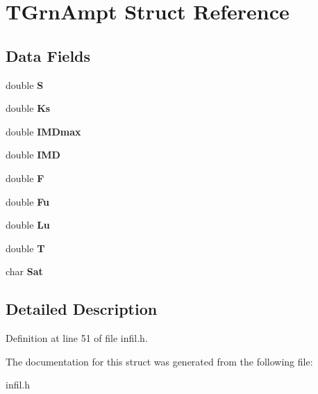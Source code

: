\hypertarget{struct_t_grn_ampt}{}\section{T\+Grn\+Ampt Struct Reference}
\label{struct_t_grn_ampt}
\subsection*{Data Fields}
\begin{DoxyCompactItemize}
\item 
\mbox{\label{struct_t_grn_ampt_a1f3afedeffb9d5e23fe337fc32161bc0}} 
double {\bfseries S}
\item 
\mbox{\label{struct_t_grn_ampt_aa9437b51e97937d66bd2c90f9a411652}} 
double {\bfseries Ks}
\item 
\mbox{\label{struct_t_grn_ampt_a5c2052ef4965513da29ddbd0b30111c7}} 
double {\bfseries I\+M\+Dmax}
\item 
\mbox{\label{struct_t_grn_ampt_a60fb2565ae40df3014f4e8f59974c6eb}} 
double {\bfseries I\+MD}
\item 
\mbox{\label{struct_t_grn_ampt_ae3520ebb3ff8d6feab3e6afb47ed4040}} 
double {\bfseries F}
\item 
\mbox{\label{struct_t_grn_ampt_a69bba2e04e7089ce6653bd4659aa742c}} 
double {\bfseries Fu}
\item 
\mbox{\label{struct_t_grn_ampt_a3760e2ccb5c56304da172d3122e96ae9}} 
double {\bfseries Lu}
\item 
\mbox{\label{struct_t_grn_ampt_ac94a6e5794c2d7b59588b14025cfba20}} 
double {\bfseries T}
\item 
\mbox{\label{struct_t_grn_ampt_a1dc5be2b84185c7f87a85bc1c7c1d050}} 
char {\bfseries Sat}
\end{DoxyCompactItemize}


\subsection{Detailed Description}


Definition at line 51 of file infil.\+h.



The documentation for this struct was generated from the following file\+:\begin{DoxyCompactItemize}
\item 
infil.\+h\end{DoxyCompactItemize}
